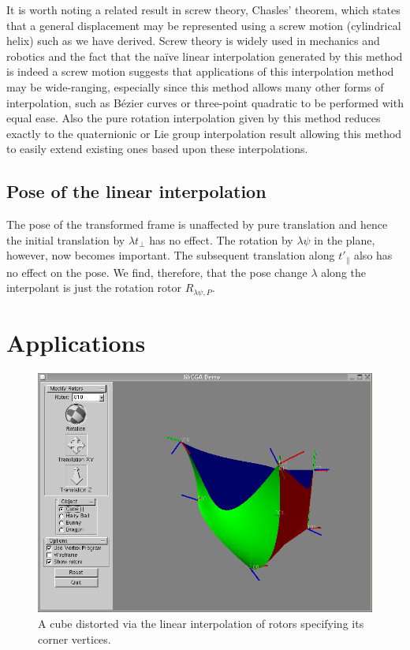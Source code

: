 It is worth noting a related result in screw theory, Chasles' theorem, which
states that a general displacement may be represented using a screw motion
(cylindrical helix) such as we have derived. Screw theory is widely used in
mechanics and robotics and the fact that the na\"ive linear interpolation
generated by this method is indeed a screw motion suggests that
applications of this interpolation method may be wide-ranging, especially since
this method allows many other forms of interpolation, such as B\'ezier curves
or three-point quadratic to be performed with equal ease. Also the pure
rotation interpolation given by this method reduces exactly to the quaternionic
or Lie group interpolation result allowing this method to easily extend
existing ones based upon these interpolations.

\subsection{Pose of the linear interpolation}

The pose of the transformed frame is unaffected by pure translation and hence the initial
translation by $\lambda t_\perp$ has no effect. The rotation by $\lambda \psi$ in the plane,
however, now becomes important. The subsequent translation along $t'_\parallel$ also has
no effect on the pose. We find, therefore, that the pose change $\lambda$ along the 
interpolant is just the rotation rotor $R_{\lambda \psi, P}$.



\section{Applications}

\begin{figure}[p]
\centering
\includegraphics[width=0.7\columnwidth]{distorted_cube}
\caption{\label{fig:distorted_cube}%
  A cube distorted via the linear interpolation of rotors specifying its
  corner vertices.
}
\end{figure}

